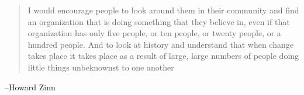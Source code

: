 \documentclass[letterpaper]{exam}
\begin{document}
  \else
    \vspace{10 cm}
    \begin{quote}
      \begin{em}
        I would encourage people to look around them in their community and find an
        organization that is doing something that they believe in, even if that
        organization has only five people, or ten people, or twenty people, or a hundred
        people. And to look at history and understand that when change takes place it
        takes place as a result of large, large numbers of people doing little things
        unbeknownst to one another
      \end{em}
    \end{quote}
    \hspace{1 cm} --Howard Zinn
  \fi
\end{document}
